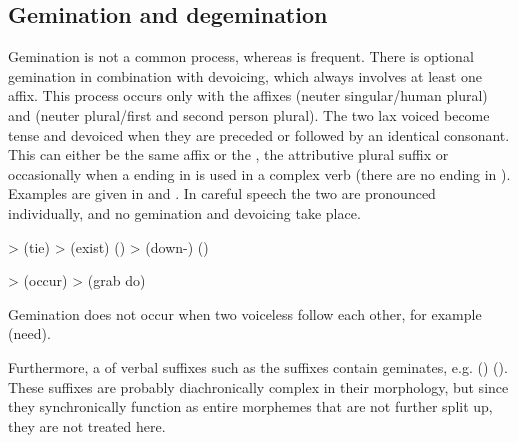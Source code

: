 \subsection{Gemination and degemination}
\label{ssec:Gemination and degemination}
Gemination is not a common process, whereas  is frequent. There is optional gemination in combination with devoicing, which always involves at least one  affix. This process occurs only with the  affixes  (neuter singular\slash human plural) and  (neuter plural\slash first and second person plural). The two lax voiced  become tense and devoiced when they are preceded or followed by an identical consonant. This can either be the same  affix or the   , the attributive plural suffix  or occasionally when a  ending in  is used in a complex verb (there are no  ending in ). Examples are given in  and . In careful speech the two  are pronounced individually, and no gemination and devoicing take place.
%
\begin{exe}
	\label{ex:d dt t phon}
	\begin{xlist}
		\ex	{} >   (tie)
		\ex	{} >   (exist) ()
		\ex	{} >   (down-) ()
	\end{xlist}

	\label{ex:bp b p phon}
	\begin{xlist}
		\ex	{} >   (occur\tsc{.pfv-pret})
		\ex	{} >   (grab do\tsc{.pfv-pret})
	\end{xlist}
\end{exe}

Gemination does not occur when two voiceless  follow each other, for example  (need).

Furthermore, a  of verbal suffixes such as the  suffixes contain geminates, e.g.  () (). These suffixes are probably diachronically complex in their morphology, but since they synchronically function as entire morphemes that are not further split up, they are not treated here.


